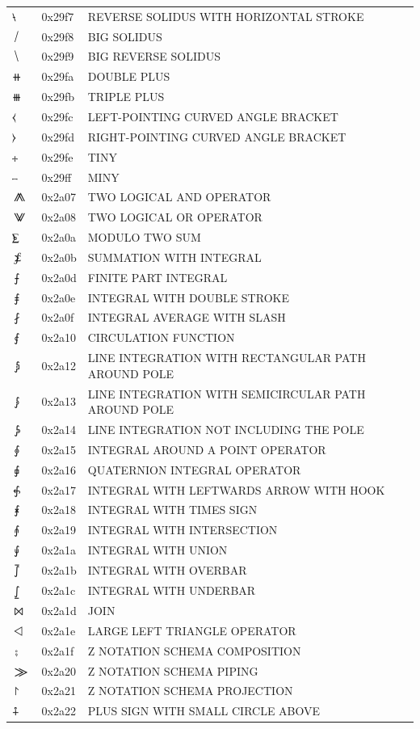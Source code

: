 \documentclass[12pt, twoside]{article}
\begin{document}
\begin{longtable}{L{1.0cm} L{2.0cm} >{\footnotesize}L{10cm}}
$⧷$&0x29f7&REVERSE SOLIDUS WITH HORIZONTAL STROKE\\
$⧸$&0x29f8&BIG SOLIDUS\\
$⧹$&0x29f9&BIG REVERSE SOLIDUS\\
$⧺$&0x29fa&DOUBLE PLUS\\
$⧻$&0x29fb&TRIPLE PLUS\\
$⧼$&0x29fc&LEFT-POINTING CURVED ANGLE BRACKET\\
$⧽$&0x29fd&RIGHT-POINTING CURVED ANGLE BRACKET\\
$⧾$&0x29fe&TINY\\
$⧿$&0x29ff&MINY\\
$⨇$&0x2a07&TWO LOGICAL AND OPERATOR\\
$⨈$&0x2a08&TWO LOGICAL OR OPERATOR\\
$⨊$&0x2a0a&MODULO TWO SUM\\
$⨋$&0x2a0b&SUMMATION WITH INTEGRAL\\
$⨍$&0x2a0d&FINITE PART INTEGRAL\\
$⨎$&0x2a0e&INTEGRAL WITH DOUBLE STROKE\\
$⨏$&0x2a0f&INTEGRAL AVERAGE WITH SLASH\\
$⨐$&0x2a10&CIRCULATION FUNCTION\\
$⨒$&0x2a12&LINE INTEGRATION WITH RECTANGULAR PATH AROUND POLE\\
$⨓$&0x2a13&LINE INTEGRATION WITH SEMICIRCULAR PATH AROUND POLE\\
$⨔$&0x2a14&LINE INTEGRATION NOT INCLUDING THE POLE\\
$⨕$&0x2a15&INTEGRAL AROUND A POINT OPERATOR\\
$⨖$&0x2a16&QUATERNION INTEGRAL OPERATOR\\
$⨗$&0x2a17&INTEGRAL WITH LEFTWARDS ARROW WITH HOOK\\
$⨘$&0x2a18&INTEGRAL WITH TIMES SIGN\\
$⨙$&0x2a19&INTEGRAL WITH INTERSECTION\\
$⨚$&0x2a1a&INTEGRAL WITH UNION\\
$⨛$&0x2a1b&INTEGRAL WITH OVERBAR\\
$⨜$&0x2a1c&INTEGRAL WITH UNDERBAR\\
$⨝$&0x2a1d&JOIN\\
$⨞$&0x2a1e&LARGE LEFT TRIANGLE OPERATOR\\
$⨟$&0x2a1f&Z NOTATION SCHEMA COMPOSITION\\
$⨠$&0x2a20&Z NOTATION SCHEMA PIPING\\
$⨡$&0x2a21&Z NOTATION SCHEMA PROJECTION\\
$⨢$&0x2a22&PLUS SIGN WITH SMALL CIRCLE ABOVE\\

\end{longtable}
\end{document}
